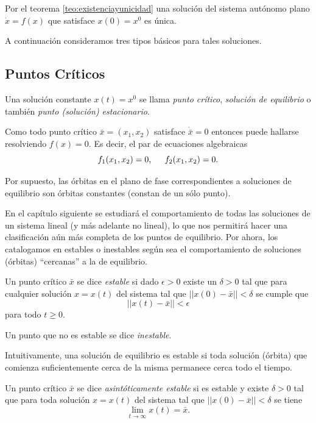 Por el teorema \ref{teo:existenciayunicidad} una solución del sistema autónomo plano $\dot{x} = f(x)$ que satisface $x(0) = x^0$ es única. 

A continuación consideramos tres tipos básicos para tales soluciones.

\subsection{Puntos Críticos}

\begin{definition} Una solución constante $x(t) = x^0$ se llama \emph{punto crítico}, \emph{solución de equilibrio} o también \emph{punto (solución) estacionario}.
\end{definition}

Como todo punto crítico $\bar{x} = (x_1,x_2)$ satisface $\dot{\bar{x}} = 0$ entonces puede hallarse resolviendo $f(x) = 0$. Es decir, el par de ecuaciones algebraicas
$$ f_1(x_1, x_2) = 0, \hspace{0.2in} f_2(x_1, x_2) = 0.$$

Por supuesto, las órbitas en el plano de fase correspondientes a soluciones de equilibrio son órbitas constantes (constan de un sólo punto).

En el capítulo siguiente se estudiará el comportamiento de todas las soluciones de un sistema lineal (y más adelante no lineal), lo que nos permitirá hacer una clasificación aún más completa de los puntos de equilibrio. Por ahora, los catalogamos en estables o inestables según sea el comportamiento de soluciones (órbitas) ``cercanas'' a la de equilibrio.

\begin{definition}Un punto crítico $\bar{x}$ se dice \emph{estable} si dado $\epsilon > 0$ existe un $\delta > 0$ tal que para cualquier solución $x = x(t)$ del sistema tal que $|| x(0) - \bar{x} || < \delta$ se cumple que
$$ || x(t) - \bar{x} || < \epsilon$$
para todo $t \geq 0$.

Un punto que no es estable se dice \emph{inestable}.
\end{definition}

Intuitivamente, una solución de equilibrio es estable si toda solución (órbita) que comienza suficientemente cerca de la misma permanece cerca todo el tiempo.

\begin{definition}Un punto crítico $\bar{x}$ se dice \emph{asintóticamente estable} si es estable y existe $\delta > 0$ tal que para toda solución $x = x(t)$ del sistema tal que $|| x(0) - \bar{x} || < \delta$ se tiene $$\lim_{t \to \infty} x(t) = \bar{x}. $$
\end{definition}

